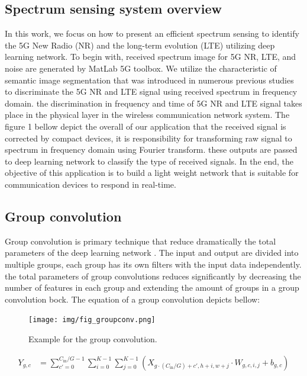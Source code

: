 \documentclass[journal]{IEEEtran} %
\begin{document}
\subsection{Spectrum sensing system overview}
In this work, we focus on how to present an efficient spectrum sensing to identify the 5G New Radio (NR) and the long-term evolution (LTE) utilizing deep learning network. To begin with, received spectrum image for 5G NR, LTE, and noise are generated by MatLab 5G toolbox. We utilize the characteristic of semantic image segmentation that was introduced in numerous previous studies to discriminate the 5G NR and LTE signal using received spectrum in frequency domain. the discrimination in frequency and time of 5G NR and LTE signal takes place in the physical layer in the wireless communication network system. The figure 1 bellow depict the overall of our application that the received signal is corrected by compact devices, it is responsibility for transforming raw signal to spectrum in frequency domain using Fourier transform. these outputs are passed to deep learning network to classify the type of received signals. In the end, the objective of this application is to build a light weight network that is suitable for communication devices to respond in real-time.

\subsection{Group convolution}
Group convolution is primary technique that reduce dramatically the total parameters of the deep learning network \cite{b9}. The input and output are divided into multiple groups, each group has its own filters with the input data independently. the total parameters of group convolutions reduces significantly by decreasing the number of features in each group and extending the amount of groups in a group convolution bock. The equation of a group convolution depicts bellow:

\begin{figure}[H]
    \centering
    \texttt{[image: img/fig\_groupconv.png]}
    \caption{Example for the group convolution.}
    \label{fig}
\end{figure}

\[
\begin{aligned}
Y_{g, c} &= \sum_{c' = 0}^{C_{\text{in}} / G - 1} \sum_{i=0}^{K-1} \sum_{j=0}^{K-1} (X_{g \cdot (C_{\text{in}} / G) + c', h+i, w+j} \cdot W_{g, c, i, j} + b_{g, c})
\end{aligned}
\]
\end{document}
